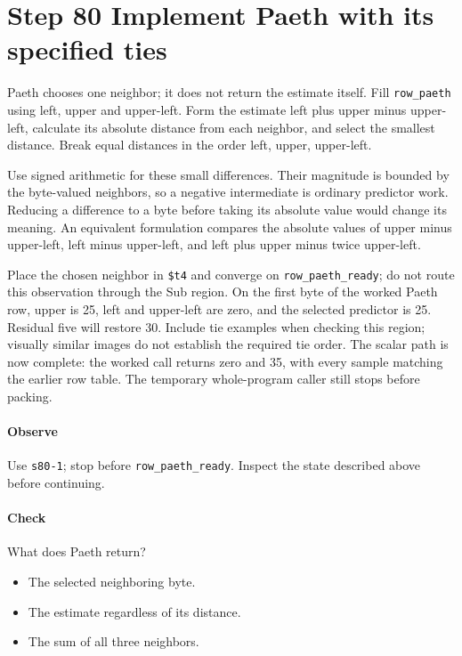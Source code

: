 \section{Step 80 Implement Paeth with its specified ties}
Paeth chooses one neighbor; it does not return the estimate itself. Fill \texttt{row\_paeth} using left, upper and upper-left. Form the estimate left plus upper minus upper-left, calculate its absolute distance from each neighbor, and select the smallest distance. Break equal distances in the order left, upper, upper-left.

Use signed arithmetic for these small differences. Their magnitude is bounded by the byte-valued neighbors, so a negative intermediate is ordinary predictor work. Reducing a difference to a byte before taking its absolute value would change its meaning. An equivalent formulation compares the absolute values of upper minus upper-left, left minus upper-left, and left plus upper minus twice upper-left.

Place the chosen neighbor in \texttt{\$t4} and converge on \texttt{row\_paeth\_ready}; do not route this observation through the Sub region. On the first byte of the worked Paeth row, upper is 25, left and upper-left are zero, and the selected predictor is 25. Residual five will restore 30. Include tie examples when checking this region; visually similar images do not establish the required tie order. The scalar path is now complete: the worked call returns zero and 35, with every sample matching the earlier row table. The temporary whole-program caller still stops before packing.

\paragraph{Observe} Use \texttt{s80-1}; stop before \texttt{row\_paeth\_ready}. Inspect the state described above before continuing.

\paragraph{Check} What does Paeth return?
\begin{itemize}
  \item[A.] The selected neighboring byte.
  \item[B.] The estimate regardless of its distance.
  \item[C.] The sum of all three neighbors.
\end{itemize}
